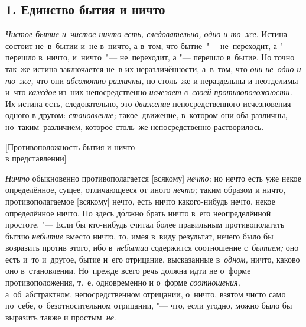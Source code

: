 
\subsection[1. Единство бытия и ничто]{1. Единство бытия и ничто}

{\em Чистое бытие и~чистое ничто есть, следовательно, одно и то~же}. Истина
состоит не~в~бытии и~не в~ничто, а в~том, что бытие~"--- не~переходит, а "---
перешло в~ничто, и~ничто~"--- не~переходит, а "--- перешло в~бытие. Но точно
так~же истина заключается не~в их неразличённости, а~в~том, что
{\em они не~одно и то~же,} что они {\em абсолютно различны,} но столь~же и
нераздельны и неотделимы и~что {\em каждое} из~них непосредственно
{\em исчезает в~своей противоположности.} Их истина есть, следовательно, это
{\em движение} непосредственного исчезновения одного в другом:
{\em становление;} такое~движение, в~котором они оба различны,
но~таким~различием, которое столь~же непосредственно растворилось.

%
{[Противоположность бытия и ничто\nopagebreak\\в представлении]}

{\em Ничто} обыкновенно противополагается [всякому] {\em нечто;} но нечто есть
уже некое определённое, сущее, отличающееся от иного {\em нечто;} таким образом
и ничто, противополагаемое [всякому] нечто, есть ничто какого-нибудь нечто,
некое определённое ничто. Но здесь д\'{о}лжно брать ничто в~его неопределённой
простоте. "--- Если бы кто-нибудь считал более правильным противополагать бытию
{\em небытие} вместо ничто, то, имея в~виду результат, нечего было бы возразить
против этого, ибо в~{\em небытии} содержится соотношение с~{\em бытием;} оно
есть и~то и~другое, бытие и~его отрицание, высказанные в~{\em одном,} ничто,
каково оно в~становлении. Но~прежде всего речь должна идти не о~форме
противоположения, т.~е. одновременно и о~форме {\em соотношения,}
а~об~абстрактном, непосредственном отрицании, о~ничто, взятом чисто само
по~себе, о~безотносительном отрицании, "--- что, если угодно, можно было бы
выразить также и простым~{\em не}.

